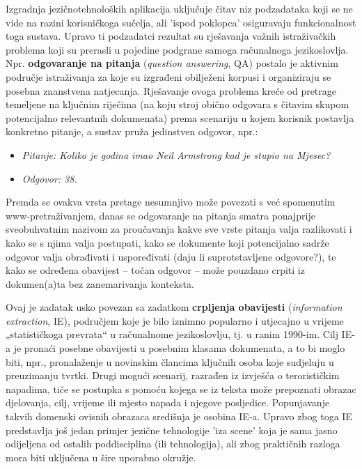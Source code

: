 \begin{multicols}{2}
Izgradnja jezičnotehnoloških aplikacija uključuje čitav niz podzadataka koji se ne vide na razini korisničkoga sučelja, ali 'ispod poklopca' osiguravaju funkcionalnost toga sustava. Upravo ti podzadatci rezultat su rješavanja važnih istraživačkih problema koji su prerasli u pojedine podgrane samoga računalnoga jezikoslovlja. Npr. \textbf{odgovaranje na pitanja} (\emph{question answering}, QA) postalo je aktivnim područje istraživanja za koje su izgrađeni obilježeni korpusi i organiziraju se posebna znanstvena natjecanja. Rješavanje ovoga problema kreće od pretrage temeljene na ključnim riječima (na koju stroj obično odgovara s čitavim skupom potencijalno relevantnih dokumenata) prema scenariju u kojem korisnik postavlja konkretno pitanje, a sustav pruža jedinstven odgovor, npr.:
		
\begin{itemize}
\item[] \textit{Pitanje: Koliko je godina imao Neil Armstrong kad je stupio na Mjesec?}
\item[] \textit{Odgovor: 38.}
\end{itemize}

Premda se ovakva vrsta pretage nesumnjivo može povezati s već spomenutim www-pretraživanjem, danas se odgovaranje na pitanja smatra ponajprije sveobuhvatnim nazivom za proučavanja kakve sve vrste pitanja valja razlikovati i kako se s njima valja postupati, kako se dokumente koji potencijalno sadrže odgovor valja obrađivati i uspoređivati (daju li suprotstavljene odgovore?), te kako se određena obavijest – točan odgovor – može pouzdano crpiti iz dokumen(a)ta bez zanemarivanja konteksta. 

Ovaj je zadatak usko povezan sa zadatkom \textbf{crpljenja obavijesti} (\emph{information extraction}, IE), područjem koje je bilo iznimno popularno i utjecajno u vrijeme „statističkoga prevrata“ u računalnome jezikoslovlju, tj. u ranim 1990-im. Cilj IE-a je pronaći posebne obavijesti u posebnim klasama dokumenata, a to bi moglo biti, npr., pronalaženje u novinskim člancima ključnih osoba koje sudjeluju u preuzimanju tvrtki. Drugi mogući scenarij, razrađen iz izvješća o terorističkim napadima, tiče se postupka s pomoću kojega se iz teksta može prepoznati obrazac djelovanja, cilj, vrijeme ili mjesto napada i njegove posljedice. Popunjavanje takvih domenski ovisnih obrazaca središnja je osobina IE-a. Upravo zbog toga IE predstavlja još jedan primjer jezične tehnologije 'iza scene' koja je sama jasno odijeljena od ostalih poddisciplina (ili tehnologija), ali zbog praktičnih razloga mora biti uključena u šire uporabno okružje.


\end{multicols}
